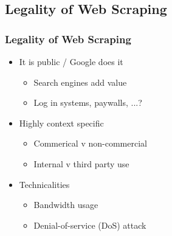 \subsection{Legality of Web Scraping}
\begin{frame}
    \frametitle{Legality of Web Scraping}

\begin{itemize}
    \item It is public / Google does it
    \begin{itemize}
    \item Search engines add value
    \item Log in systems, paywalls, ...?
    \end{itemize}
\end{itemize}

\begin{itemize}
    \item Highly context specific
    \begin{itemize}
    \item Commerical v non-commercial
    \item Internal v third party use
    \end{itemize}
\end{itemize}

\begin{itemize}
    \item Technicalities
    \begin{itemize}
    \item Bandwidth usage
    \item Denial-of-service (DoS) attack
    \end{itemize}
\end{itemize}

\end{frame}



